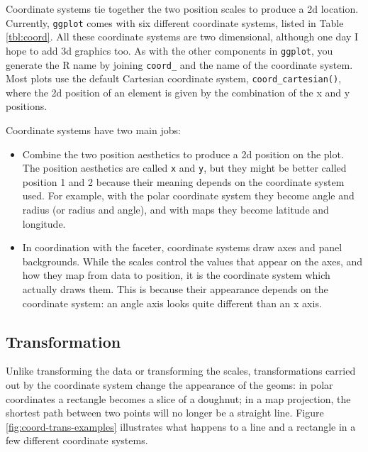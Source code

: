 Coordinate systems tie together the two position scales to produce a 2d
location. Currently, \texttt{ggplot} comes with six different coordinate
systems, listed in Table \ref{tbl:coord}. All these coordinate systems
are two dimensional, although one day I hope to add 3d graphics too. As
with the other components in \texttt{ggplot}, you generate the R name by
joining \texttt{coord\_} and the name of the coordinate system. Most
plots use the default Cartesian coordinate system,
\texttt{coord\_cartesian()}, where the 2d position of an element is
given by the combination of the x and y positions.
 

Coordinate systems have two main jobs:

\begin{itemize}
\itemsep1pt\parskip0pt
\item
  Combine the two position aesthetics to produce a 2d position on the
  plot. The position aesthetics are called \texttt{x} and \texttt{y},
  but they might be better called position 1 and 2 because their meaning
  depends on the coordinate system used. For example, with the polar
  coordinate system they become angle and radius (or radius and angle),
  and with maps they become latitude and longitude.
\item
  In coordination with the faceter, coordinate systems draw axes and
  panel backgrounds. While the scales control the values that appear on
  the axes, and how they map from data to position, it is the coordinate
  system which actually draws them. This is because their appearance
  depends on the coordinate system: an angle axis looks quite different
  than an x axis.
\end{itemize}

\subsection{Transformation}\label{sub:coord-transformation}

Unlike transforming the data or transforming the scales, transformations
carried out by the coordinate system change the appearance of the geoms:
in polar coordinates a rectangle becomes a slice of a doughnut; in a map
projection, the shortest path between two points will no longer be a
straight line. Figure \ref{fig:coord-trans-examples} illustrates what
happens to a line and a rectangle in a few different coordinate systems.


